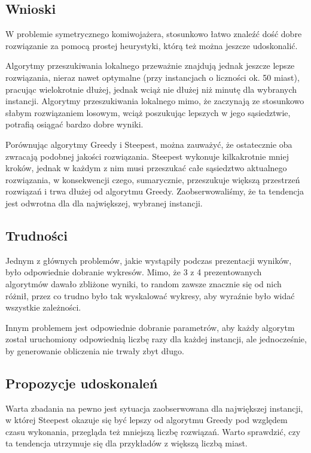 \subsection{Wnioski}

W problemie symetrycznego komiwojażera, stosunkowo łatwo znaleźć dość dobre rozwiązanie za pomocą prostej heurystyki, którą też można jeszcze udoskonalić.

Algorytmy przeszukiwania lokalnego przeważnie znajdują jednak jeszcze lepsze rozwiązania, nieraz nawet optymalne (przy instancjach o liczności ok. 50 miast), pracując wielokrotnie dłużej, jednak wciąż nie dłużej niż minutę dla wybranych instancji. Algorytmy przeszukiwania lokalnego mimo, że zaczynają ze stosunkowo słabym rozwiązaniem losowym, wciąż poszukując lepszych w jego sąsiedztwie, potrafią osiągać bardzo dobre wyniki.

Porównując algorytmy Greedy i Steepest, można zauważyć, że ostatecznie oba zwracają podobnej jakości rozwiązania. Steepest wykonuje kilkakrotnie mniej kroków, jednak w każdym z nim musi przeszukać całe sąsiedztwo aktualnego rozwiązania, w konsekwencji czego, sumarycznie, przeszukuje większą przestrzeń rozwiązań i trwa dłużej od algorytmu Greedy. Zaobserwowaliśmy, że ta tendencja jest odwrotna dla dla największej, wybranej instancji.

\subsection{Trudności}

Jednym z głównych problemów, jakie wystąpiły podczas prezentacji wyników, było odpowiednie dobranie wykresów. Mimo, że 3 z 4 prezentowanych algorytmów dawało zbliżone wyniki, to random zawsze znacznie się od nich różnił, przez co trudno było tak wyskalować wykresy, aby wyraźnie było widać wszystkie zależności. 

Innym problemem jest odpowiednie dobranie parametrów, aby każdy algorytm został uruchomiony odpowiednią liczbę razy dla każdej instancji, ale jednocześnie, by generowanie obliczenia nie trwały zbyt długo.

\subsection{Propozycje udoskonaleń}

Warta zbadania na pewno jest sytuacja zaobserwowana dla największej instancji, w której Steepest okazuje się być lepszy od algorytmu Greedy pod względem czasu wykonania, przegląda też mniejszą liczbę rozwiązań. Warto sprawdzić, czy ta tendencja utrzymuje się dla przykładów z większą liczbą miast.